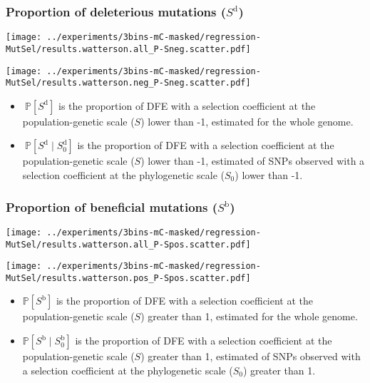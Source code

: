\documentclass{article}
\newcommand{\proba}{\mathbb{P}}
\newcommand{\Sphy}{S_{0}}
\newcommand{\divDel}{\Sphy^{\text{d}}}
\newcommand{\divAdv}{\Sphy^{\text{b}}}
\newcommand{\given}{\mid}
\newcommand{\Spop}{S}
\newcommand{\polyDel}{\Spop^{\text{d}}}
\newcommand{\polyAdv}{\Spop^{\text{b}}}
\begin{document}
    \subsubsection{Proportion of deleterious mutations ($\polyDel$)}\label{subsec:proportion-deleterious-mutations}
    \begin{minipage}{0.49\linewidth}
        \texttt{[image: ../experiments/3bins-mC-masked/regression-MutSel/results.watterson.all\_P-Sneg.scatter.pdf]}
    \end{minipage}
    \begin{minipage}{0.49\linewidth}
        \texttt{[image: ../experiments/3bins-mC-masked/regression-MutSel/results.watterson.neg\_P-Sneg.scatter.pdf]}
    \end{minipage}
    \begin{itemize}
        \item $\ \proba [ \polyDel ]$ is the proportion of DFE with a selection coefficient at the population-genetic scale ($\Spop$) lower than -1, estimated for the whole genome.
        \item $\ \proba [ \polyDel \given \divDel]$ is the proportion of DFE with a selection coefficient at the population-genetic scale ($\Spop$) lower than -1, estimated of SNPs observed with a selection coefficient at the phylogenetic scale ($\Sphy$) lower than -1.
    \end{itemize}

    \subsubsection{Proportion of beneficial mutations ($\polyAdv$)}\label{subsec:proportion-beneficial-mutations}
    \begin{minipage}{0.49\linewidth}
        \texttt{[image: ../experiments/3bins-mC-masked/regression-MutSel/results.watterson.all\_P-Spos.scatter.pdf]}
    \end{minipage}
    \begin{minipage}{0.49\linewidth}
        \texttt{[image: ../experiments/3bins-mC-masked/regression-MutSel/results.watterson.pos\_P-Spos.scatter.pdf]}
    \end{minipage}
    \begin{itemize}
        \item $ \proba [ \polyAdv ]$ is the proportion of DFE with a selection coefficient at the population-genetic scale ($\Spop$) greater than 1, estimated for the whole genome.
        \item $\proba [ \polyAdv \given \divAdv] $ is the proportion of DFE with a selection coefficient at the population-genetic scale ($\Spop$) greater than 1, estimated of SNPs observed with a selection coefficient at the phylogenetic scale ($\Sphy$) greater than 1.
    \end{itemize}
\end{document}
